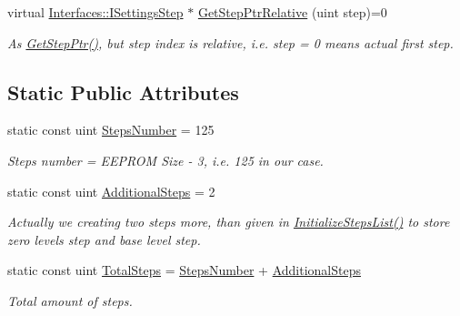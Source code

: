 \begin{DoxyCompactItemize}
virtual \hyperlink{class_interfaces_1_1_i_settings_step}{Interfaces\+::\+I\+Settings\+Step} $\ast$ \hyperlink{class_interfaces_1_1_i_settings_generator_a8de5944be5295009b7407772bc9b1b3b}{Get\+Step\+Ptr\+Relative} (uint step)=0
\begin{DoxyCompactList}\small\item\em As \hyperlink{class_interfaces_1_1_i_settings_generator_af1b65a18c3ade3235715ae2e9cdbcfe0}{Get\+Step\+Ptr()}, but step index is relative, i.\+e. step = 0 means actual first step. \end{DoxyCompactList}\end{DoxyCompactItemize}
\subsection*{Static Public Attributes}
\begin{DoxyCompactItemize}
\item 
\mbox{\label{class_interfaces_1_1_i_settings_generator_a4d30fe2c1b05dcf333bf9074cde59697}} 
static const uint \hyperlink{class_interfaces_1_1_i_settings_generator_a4d30fe2c1b05dcf333bf9074cde59697}{Steps\+Number} = 125
\begin{DoxyCompactList}\small\item\em Steps number = E\+E\+P\+R\+OM Size -\/ 3, i.\+e. 125 in our case. \end{DoxyCompactList}\item 
\mbox{\label{class_interfaces_1_1_i_settings_generator_a1762ee2d49d5347d39deced532795972}} 
static const uint \hyperlink{class_interfaces_1_1_i_settings_generator_a1762ee2d49d5347d39deced532795972}{Additional\+Steps} = 2
\begin{DoxyCompactList}\small\item\em Actually we creating two steps more, than given in \hyperlink{class_interfaces_1_1_i_settings_generator_a4aa0307e906c003012aad75101072c65}{Initialize\+Steps\+List()} to store zero levels step and base level step. \end{DoxyCompactList}\item 
\mbox{\label{class_interfaces_1_1_i_settings_generator_ab9566ce8cb583c2a8029e79c459fee84}} 
static const uint \hyperlink{class_interfaces_1_1_i_settings_generator_ab9566ce8cb583c2a8029e79c459fee84}{Total\+Steps} = \hyperlink{class_interfaces_1_1_i_settings_generator_a4d30fe2c1b05dcf333bf9074cde59697}{Steps\+Number} + \hyperlink{class_interfaces_1_1_i_settings_generator_a1762ee2d49d5347d39deced532795972}{Additional\+Steps}
\begin{DoxyCompactList}\small\item\em Total amount of steps. \end{DoxyCompactList}\end{DoxyCompactItemize}


